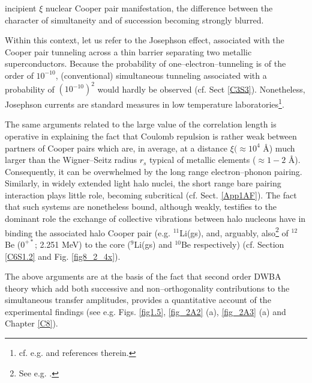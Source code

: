 incipient $\xi$ nuclear Cooper pair manifestation, the difference between the character of simultaneity and of succession becoming strongly blurred.



Within this context, let us refer to the Josephson effect, associated with the Cooper pair tunneling across a thin barrier separating two metallic superconductors. Because the probability of one--electron--tunneling is of the order of $10^{-10}$, (conventional) simultaneous tunneling associated with a probability of $(10^{-10})^2$ would hardly be observed (cf. Sect \ref{C3S3}). Nonetheless, Josephson currents are standard measures in low temperature laboratories\footnote{cf. e.g. \cite{Rogalla:12} and references therein.}.


The same arguments related  to the large value of the correlation length is operative in explaining the fact that Coulomb repulsion is rather weak between partners of Cooper pairs which are, in average, at a distance $\xi (\approx 10^{4}$ \AA{}) much larger than the Wigner--Seitz radius $r_s$ typical of metallic elements ($\approx 1-2$ \AA{}). Consequently, it can be overwhelmed by the long range electron--phonon pairing. Similarly, in widely extended light halo nuclei, the short range bare pairing interaction plays little role, becoming subcritical (cf. Sect. \ref{App1AF}). The fact that such systems are nonetheless bound, although weakly, testifies to the dominant role the exchange of collective vibrations between halo nucleons have in binding the associated halo Cooper pair (e.g. $^{11}$Li(gs), and, arguably, also\footnote{See e.g. \cite{Johansen:13}.} of $^{12}$Be ($0^{+*}$; 2.251 MeV) to the core ($^{9}$Li(gs) and $^{10}$Be respectively) (cf. Section \ref{C6S1.2} and Fig. \ref{fig8_2_4x}).


The above arguments are at the basis of the fact that second order DWBA theory which add both successive and non--orthogonality contributions to the simultaneous transfer amplitudes, provides a quantitative account of the experimental findings (see e.g. Figs. \ref{fig1.5}, \ref{fig_2A2} (a), \ref{fig_2A3} (a) and Chapter  \ref{C8}).


